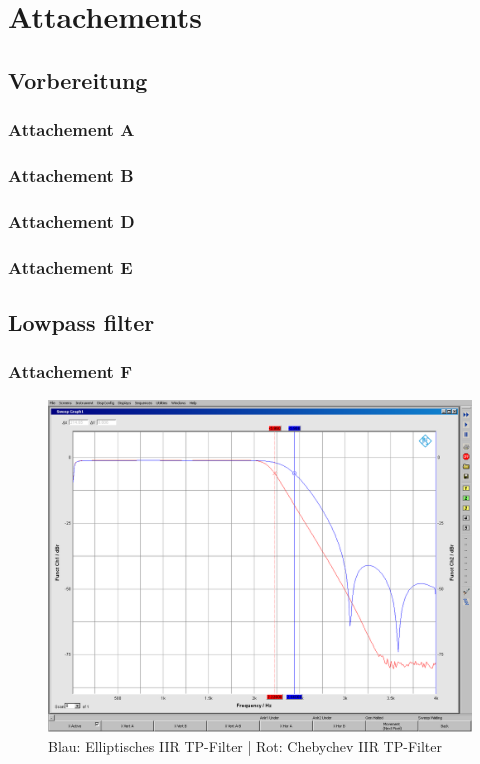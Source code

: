 \section{Attachements}
\subsection{Vorbereitung}
\subsubsection{Attachement A}

\subsubsection{Attachement B}

\subsubsection{Attachement D}

\subsubsection{Attachement E}

\subsection{Lowpass filter}
\subsubsection{Attachement F}

	\begin{figure}[h]
		\centering
		\includegraphics[width=0.8\linewidth]{Bilder/EllipCheby}
		\caption{Blau: Elliptisches IIR TP-Filter | Rot: Chebychev IIR TP-Filter}
		\label{fig:EllipCheby}
	\end{figure}

